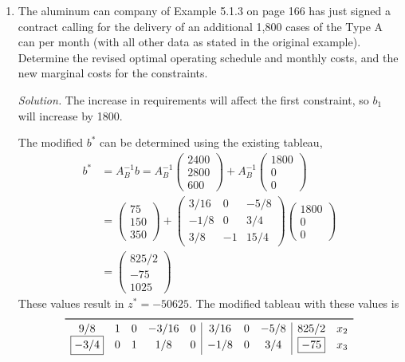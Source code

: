 \documentclass{homework}
\newcommand{\solution}{	\vspace{1em} \textit{Solution.} \quad }
\newcommand{\bolditem}[1][YYY]{\item[\textbf{#1}]}
\begin{document}
\begin{enumerate}
		\pagebreak
		
		\bolditem[5.6.7] The aluminum can company of Example 5.1.3 on page 166 has just signed a contract calling for the delivery of an additional 1,800 cases of the Type A can per month (with all other data as stated in the original example). Determine the revised optimal operating schedule and monthly costs, and the new marginal costs for the constraints.
		
		\solution The increase in requirements will affect the first constraint, so $b_1$ will increase by 1800.
			
			The modified $b^*$ can be determined using the existing tableau, \begin{align*}
				b^* & = A_B^{-1} b = A_B^{-1} \begin{pmatrix}
					2400 \\ 2800 \\ 600
				\end{pmatrix} + A_B^{-1} \begin{pmatrix}
					1800 \\ 0 \\ 0
			\end{pmatrix} \\
			& = \begin{pmatrix}
				75 \\ 150 \\ 350
			\end{pmatrix}
			+ \begin{pmatrix}
				3/16 & 0 & -5/8 \\
				-1/8 & 0 & 3/4 \\
				3/8 & -1 & 15/4
			\end{pmatrix} \begin{pmatrix}
			1800 \\ 0 \\ 0
		\end{pmatrix} \\
		& = \begin{pmatrix}
			825/2 \\ -75 \\ 1025
		\end{pmatrix}
			\end{align*}
			These values result in $z^*=-50625$. The modified tableau with these values is \begin{align*}
				\begin{array}{ccccc|ccc|cc}
					\toprule
					9/8 & 1 & 0 & -3/16 & 0 & 3/16 & 0 & -5/8 & 825/2 & x_2 \\
					\boxed{-3/4} & 0 & 1 & 1/8 & 0 & -1/8 & 0 & 3/4 & \boxed{-75} & x_3 \\

\end{array}
\end{align*}
\end{enumerate}
\end{document}

